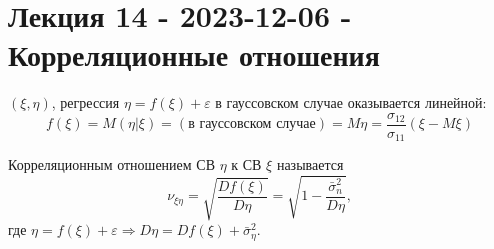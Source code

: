 \section{Лекция 14 - 2023-12-06 - Корреляционные отношения}

$(\xi, \eta)$, регрессия $\eta = f(\xi) + \varepsilon$
в гауссовском случае оказывается линейной:
\[
  f(\xi) = M(\eta | \xi) = (\text{в гауссовском случае}) = M\eta = \frac{\sigma_{12}}{\sigma_{11}} (\xi - M\xi)
\]

\begin{definition}
  Корреляционным отношением СВ $\eta$ к СВ $\xi$ называется 
  \[
    \nu_{\xi \eta} = \sqrt{\frac{Df(\xi)}{D\eta}} = \sqrt{1 - \frac{\bar\sigma^2_n}{D\eta}}, 
  \]
  где $\eta = f(\xi) + \varepsilon \Rightarrow D\eta = Df(\xi) + \bar \sigma_\eta^2$.
\end{definition}


